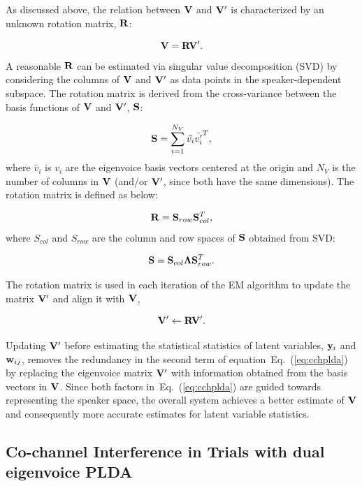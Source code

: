 As discussed above, the relation between ${\bf V}$ and ${\bf V}^\prime$ is characterized by an unknown rotation matrix, ${\bf R}$:

\begin{equation}
{\bf V} = {\bf RV}^\prime.
\end{equation}
A reasonable ${\bf R}$ can be estimated via singular value decomposition (SVD) by considering the columns of ${\bf V}$ and ${\bf V}^\prime$ as data points in the speaker-dependent subspace. The rotation matrix is derived from the cross-variance between the basis functions of ${\bf V}$ and ${\bf V}^\prime$, ${\bf S}$:

\begin{equation}
{\bf S} = {\sum\limits_{i=1}^{N_V}\tilde{{v}_i}\tilde{{v}^\prime_i}^T},
\end{equation}
where $\tilde{v_i}$ is $v_i$ are the eigenvoice basis vectors centered at the origin and $N_V$ is the number of columns in ${\bf V}$ (and/or ${\bf V}^\prime$, since both have the same dimensions). The rotation matrix is defined as below:

\begin{equation}
{\bf R} = {\bf S}_{row}{\bf S}_{col}^T,
\end{equation}
where $S_{col}$ and $S_{row}$ are the column and row spaces of ${\bf S}$ obtained from SVD:

\begin{equation}
{\bf S} = {\bf S}_{col}{\bf \Lambda}{\bf S}_{row}^T.
\end{equation}

The rotation matrix is used in each iteration of the EM algorithm to update the matrix ${\bf V}^\prime$ and align it with ${\bf V}$, 

\begin{equation}
{\bf V}^\prime \leftarrow {\bf RV^\prime}. 
\end{equation}

Updating ${\bf V}^\prime$ before estimating the statistical statistics of latent variables, ${\bf y}_{i}$ and ${\bf w}_{ij}$, removes the redundancy in the second term of equation~Eq.~(\ref{eq:cchplda}) by replacing the eigenvoice matrix ${\bf V}^\prime$ with information obtained from the basis vectors in ${\bf V}$. Since both factors in~Eq.~(\ref{eq:cchplda}) are guided towards representing the speaker space, the overall system achieves a better estimate of ${\bf V}$ and consequently more accurate estimates for latent variable statistics. 

\newpage
\subsection{Co-channel Interference in Trials with dual eigenvoice PLDA} 
\label{ssec:dualevplda_exp}

